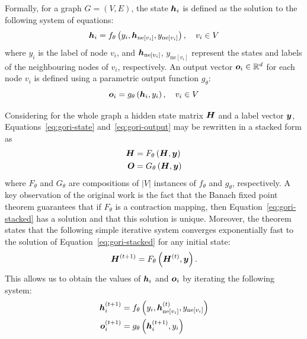 Formally, for a graph \( G = (V, E) \), the state \( \bm{h}_i \) is defined as the solution to the following system of equations:
\begin{equation}\label{eq:gori-state}
	\bm{h}_i = f_\theta \left( y_i, \bm{h}_{\mathrm{ne}[v_i]}, y_{\mathrm{ne}[v_i]} \right) , \quad v_i \in V
\end{equation}
where \( y_i \) is the label of node \( v_i \), and \( \bm{h}_{\mathrm{ne}[v_i]} \), \( y_{\mathrm{ne}[v_i]} \) represent the states and labels of the neighbouring nodes of \( v_i \), respectively. An output vector \( \bm{o}_i \in \mathbb{R}^d \) for each node \( v_i \) is defined using a parametric output function \( g_\theta \):
\begin{equation}\label{eq:gori-output}
	\bm{o}_i = g_\theta \left( \bm{h}_i, y_i \right) , \quad v_i \in V
\end{equation}

Considering for the whole graph a hidden state matrix \( \bm{H} \) and a label vector \( \bm{y} \), Equations~\ref{eq:gori-state} and~\ref{eq:gori-output} may be rewritten in a stacked form as
\begin{equation}\label{eq:gori-stacked}
	\begin{split}
		\bm{H} &= F_\theta \left( \bm{H}, \bm{y} \right) \\
		\bm{O} &= G_\theta \left( \bm{H}, \bm{y} \right)
	\end{split}
\end{equation}
where \( F_\theta \) and \( G_\theta \) are compositions of \( \left\lvert V \right\rvert \) instances of \( f_\theta \) and \( g_\theta \), respectively. A key observation of the original work is the fact that the Banach fixed point theorem guarantees that if \( F_\theta \) is a contraction mapping, then Equation~\ref{eq:gori-stacked} has a solution and that this solution is unique. Moreover, the theorem states that the following simple iterative system converges exponentially fast to the solution of Equation~\ref{eq:gori-stacked} for any initial state:
\begin{equation}
	\bm{H}^{(t+1)} = F_\theta \left( \bm{H}^{(t)}, \bm{y} \right).
\end{equation}
This allows us to obtain the values of \( \bm{h}_i \) and \( \bm{o}_i \) by iterating the following system:
\begin{equation}\label{eq:gori-iterative}
	\begin{split}
		\bm{h}_i^{(t+1)} &= f_\theta \left( y_i, \bm{h}_{\mathrm{ne}[v_i]}^{(t)}, y_{\mathrm{ne}[v_i]} \right) \\
		\bm{o}_i^{(t+1)} &= g_\theta \left( \bm{h}_i^{(t+1)}, y_i \right)
	\end{split}
\end{equation}

